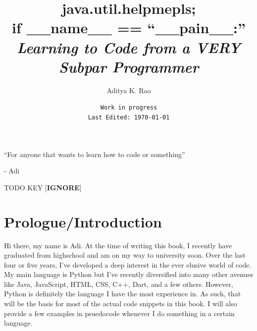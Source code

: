 \documentclass[12pt,a4paper]{book}
\newenvironment{dedication}
{%
	\thispagestyle{empty}%
	\vspace*{\stretch{1}}%
	\itshape             %
	\raggedleft          %
}
{\par %
	\vspace{\stretch{3}} %
	\clearpage           %
}
\begin{document}
	\title{java.util.helpmepls; \\
	if \_\_name\_\_ == ``\_\_pain\_\_:'' \\
	\large{\textit{Learning to Code from a VERY Subpar Programmer}}}
	\author{Aditya K. Rao}
	\date{\texttt{Work in progress \\ Last Edited: \today}}
	\maketitle

	\begin{dedication}
		``For anyone that wants to learn how to code or something''
		\par   %
		
		\vspace{\baselineskip}
		- Adi
	\end{dedication}
	
	\tableofcontents
	\listoftodos
	TODO KEY [\textbf{IGNORE}]

	
	\chapter*{Prologue/Introduction}  \label{chap:intro}
		Hi there, my name is Adi. At the time of writing this book, I recently have graduated from highschool and am on my way to university soon. Over the last four or five years, I've developed a deep interest in the ever elusive world of code. My main language is Python but I've recently diversified into many other avenues like Java, JavaScript, HTML, CSS, C++, Dart, and a few others. However, Python is definitely the language I have the most experience in. As such, that will be the basis for most of the actual code snippets in this book. I will also provide a few examples in psuedocode whenever I do something in a certain language. 
		
\end{document}

